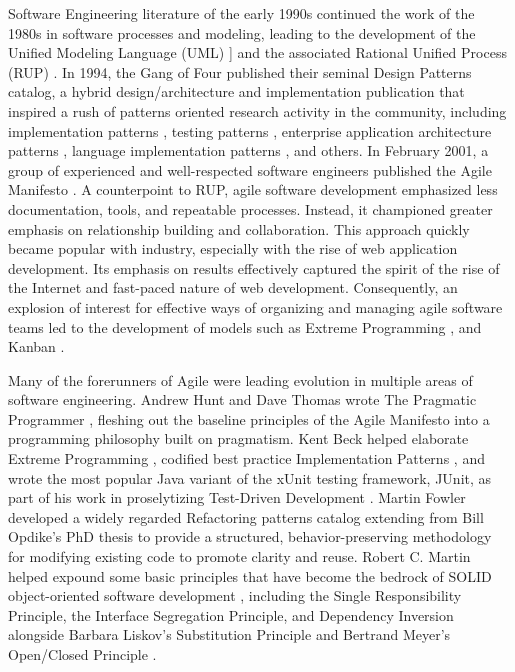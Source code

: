 Software Engineering literature of the early 1990s continued the work of the 1980s in software processes and modeling, leading to the development of the Unified Modeling Language (UML) \cite{Rumbaugh1999}] and the associated Rational Unified Process (RUP) \cite{Jacobson1999}. In 1994, the Gang of Four published their seminal Design Patterns \cite{Gamma1994} catalog, a hybrid design/architecture and implementation publication that inspired a rush of patterns oriented research activity in the community, including implementation patterns \cite{Kent2007}, testing patterns \cite{Beck2002}, enterprise application architecture patterns \cite{Fowler2002}, language implementation patterns \cite{Parr2010}, and others. In February 2001, a group of experienced and well-respected software engineers published the Agile Manifesto \cite{Beck2001}. A counterpoint to RUP, agile software development emphasized less documentation, tools, and repeatable processes. Instead, it championed greater emphasis on relationship building and collaboration. This approach quickly became popular with industry, especially with the rise of web application development. Its emphasis on results effectively captured the spirit of the rise of the Internet and fast-paced nature of web development. Consequently, an explosion of interest for effective ways of organizing and managing agile software teams led to the development of models such as Extreme Programming \cite{Beck1999,Rising2000}, and Kanban \cite{Anderson2010}.


Many of the forerunners of Agile were leading evolution in multiple areas of software engineering. Andrew Hunt and Dave Thomas wrote The Pragmatic Programmer \cite{Hunt2010}, fleshing out the baseline principles of the Agile Manifesto into a programming philosophy built on pragmatism. Kent Beck helped elaborate Extreme Programming \cite{Beck1999}, codified best practice Implementation Patterns \cite{Kent2007}, and wrote the most popular Java variant of the xUnit testing framework, JUnit, as part of his work in proselytizing Test-Driven Development \cite{Beck2002}. Martin Fowler developed a widely regarded Refactoring patterns catalog \cite{Fowler1999} extending from Bill Opdike’s PhD thesis \cite{Opdyke1992} to provide a structured, behavior-preserving methodology for modifying existing code to promote clarity and reuse. Robert C. Martin helped expound some basic principles that have become the bedrock of SOLID object-oriented software development \cite{Martin2002}, including the Single Responsibility Principle, the Interface Segregation Principle, and Dependency Inversion alongside Barbara Liskov’s Substitution Principle \cite{Liskov1987} and Bertrand Meyer’s Open/Closed Principle \cite{Meyer1997}.


